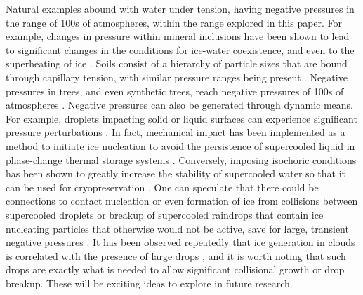 \documentclass[journal abbreviation, manuscript]{copernicus}
\begin{document}
Natural examples abound with water under tension, having negative pressures in the range of 100s of atmospheres, within the range explored in this paper. For example, changes in pressure within mineral inclusions have been shown to lead to significant changes in the conditions for ice-water coexistence, and even to the superheating of ice \citep{roedder1967metastable}. Soils consist of a hierarchy of particle sizes that are bound through capillary tension, with similar pressure ranges being present \citep{seiphoori2020}. Negative pressures in trees, and even synthetic trees, reach negative pressures of 100s of atmospheres \citep{wheeler2008transpiration}. Negative pressures can also be generated through dynamic means. For example, droplets impacting solid or liquid surfaces can experience significant pressure perturbations \citep{cheng2022drop}. In fact, mechanical impact has been implemented as a method to initiate ice nucleation to avoid the persistence of supercooled liquid in phase-change thermal storage systems \citep{wang2022nucleation}. Conversely, imposing isochoric conditions has been shown to greatly increase the stability of supercooled water so that it can be used for cryopreservation \citep{powell2020isochoric}. One can speculate that there could be connections to contact nucleation or even formation of ice from collisions between supercooled droplets \citep{alkezweeny1969freezing} or breakup of supercooled raindrops that contain ice nucleating particles that otherwise would not be active, save for large, transient negative pressures \citep{james2021impact}. It has been observed repeatedly that ice generation in clouds is correlated with the presence of large drops \citep{rangno1991ice,lance2011cloud}, and it is worth noting that such drops are exactly what is needed to allow significant collisional growth or drop breakup. These will be exciting ideas to explore in future research.
\end{document}
